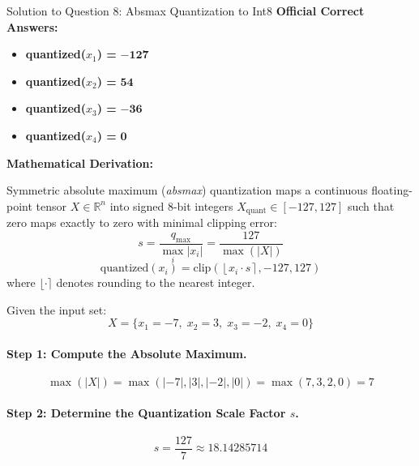 \documentclass[11pt,a4paper]{article}
\begin{document}
\begin{solutionbox}{Solution to Question 8: Absmax Quantization to Int8}
\textbf{Official Correct Answers:}
\begin{itemize}[leftmargin=2em]
    \item \textbf{quantized($x_1$) =} $\mathbf{-127}$
    \item \textbf{quantized($x_2$) =} $\mathbf{54}$
    \item \textbf{quantized($x_3$) =} $\mathbf{-36}$
    \item \textbf{quantized($x_4$) =} $\mathbf{0}$
\end{itemize}

\medskip
\textbf{Mathematical Derivation:}

Symmetric absolute maximum (\textit{absmax}) quantization maps a continuous floating-point tensor $X \in \mathbb{R}^n$ into signed 8-bit integers $X_{\text{quant}} \in [-127, 127]$ such that zero maps exactly to zero with minimal clipping error:
\begin{equation}
    s = \frac{q_{\max}}{\max_{i} |x_i|} = \frac{127}{\max(|X|)}
\end{equation}
\begin{equation}
    \text{quantized}(x_i) = \text{clip}\left(\left\lfloor x_i \cdot s \right\rceil, -127, 127\right)
\end{equation}
where $\lfloor \cdot \rceil$ denotes rounding to the nearest integer.

Given the input set:
\begin{equation}
    X = \{x_1 = -7, \; x_2 = 3, \; x_3 = -2, \; x_4 = 0\}
\end{equation}

\paragraph{Step 1: Compute the Absolute Maximum.}
\begin{equation}
    \max(|X|) = \max(|-7|, |3|, |-2|, |0|) = \max(7, 3, 2, 0) = 7
\end{equation}

\paragraph{Step 2: Determine the Quantization Scale Factor $s$.}
\begin{equation}
    s = \frac{127}{7} \approx 18.14285714
\end{equation}


\end{solutionbox}
\end{document}
